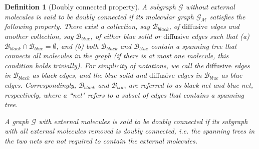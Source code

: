\documentclass{article}
\newcommand{\1}{\mathds{1}}
\numberwithin{equation}{section}
\renewcommand{\cal}{\mathcal}
\newcommand{\dashed}{\text{diffusive}}
\theoremstyle{plain} %
\newtheorem{definition}[theorem]{Definition}
\theoremstyle{remark}
\newcommand{\cor}{\color{red}}
\newcommand{\cob}{\color{purple}}
\newcommand{\nc}{\normalcolor}
\begin{document}
\begin{definition} [Doubly connected property]\label{def 2net}  %
A subgraph $\cal G$ without external molecules is said to be \emph{doubly connected} if its molecular graph $\cal G_{\cal M}$ satisfies the following property. There exist a collection, say $\cal B_{black}$, of $\dashed$ edges and another collection, say $\cal B_{blue}$, of  either blue solid or  $\dashed$ edges  such that (a) $\cal B_{black}\cap \cal B_{blue}=\emptyset$, and (b) both  $\cal B_{black}$ and $\cal B_{blue}$ contain a spanning tree %
that connects all molecules in the graph (if there is at most one molecule, this condition holds trivially). For simplicity of notations, we call the $\dashed$ edges in $\cal B_{black}$ as black edges, and the blue solid and $\dashed$ edges in $\cal B_{blue}$ as blue edges. Correspondingly, $\cal B_{black}$ and $\cal B_{blue}$ are referred to as \emph{black net} and \emph{blue net}, respectively,  where a ``net" refers to a subset of edges that contains a spanning tree.  


A graph  $\cal G$ with external molecules is said to be doubly connected if its subgraph with all external molecules removed is doubly connected, i.e. the spanning trees in the two nets are not required to contain the external molecules.
\end{definition}
\end{document}
